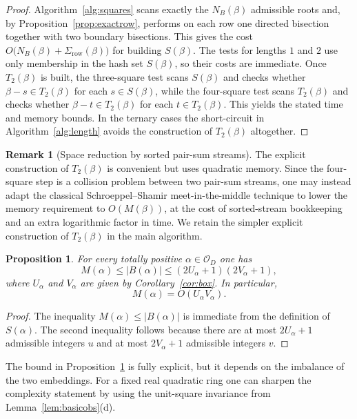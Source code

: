 \documentclass[manuscript,screen]{acmart}
\renewcommand{\le}{\leqslant}
\theoremstyle{plain}
\newtheorem{proposition}[theorem]{Proposition}
\theoremstyle{definition}
\theoremstyle{nonitalicremark}
\newtheorem{remark}[theorem]{Remark}
\newcommand{\OD}{\mathcal{O}_D}
\begin{document}
\begin{proof}
Algorithm~\ref{alg:squares} scans exactly the $N_B(\beta)$ admissible roots and, by
Proposition~\ref{prop:exactrow}, performs on each row one directed bisection together with two
boundary bisections. This gives the cost
$O\!\bigl(N_B(\beta)+\Sigma_{\mathrm{row}}(\beta)\bigr)$ for building $S(\beta)$.
The tests for lengths $1$ and $2$ use only membership in the hash set $S(\beta)$, so their
costs are immediate. Once $T_2(\beta)$ is built, the three-square test scans $S(\beta)$ and
checks whether $\beta-s\in T_2(\beta)$ for each $s\in S(\beta)$, while the four-square test
scans $T_2(\beta)$ and checks whether $\beta-t\in T_2(\beta)$ for each $t\in T_2(\beta)$.
This yields the stated time and memory bounds. In the ternary cases the short-circuit in
Algorithm~\ref{alg:length} avoids the construction of $T_2(\beta)$ altogether.
\end{proof}

\begin{remark}[Space reduction by sorted pair-sum streams]\label{rem:ss}
The explicit construction of $T_2(\beta)$ is convenient but uses quadratic memory.
Since the four-square step is a collision problem between two pair-sum streams, one may instead
adapt the classical Schroeppel--Shamir meet-in-the-middle technique \cite{SS} to lower the memory
requirement to $O(M(\beta))$, at the cost of sorted-stream bookkeeping and an extra logarithmic
factor in time. We retain the simpler explicit construction of $T_2(\beta)$ in the main
algorithm.
\end{remark}

\begin{proposition}\label{prop:boxsize}
For every totally positive $\alpha \in \OD$ one has
\[
M(\alpha) \le |B(\alpha)| \le (2U_\alpha+1)(2V_\alpha+1),
\]
where $U_\alpha$ and $V_\alpha$ are given by Corollary~\ref{cor:box}.
In particular,
\[
M(\alpha)=O(U_\alpha V_\alpha).
\]
\end{proposition}

\begin{proof}
The inequality $M(\alpha)\le |B(\alpha)|$ is immediate from the definition of $S(\alpha)$.
The second inequality follows because there are at most $2U_\alpha+1$ admissible integers $u$
and at most $2V_\alpha+1$ admissible integers $v$.
\end{proof}

The bound in Proposition~\ref{prop:boxsize} is fully explicit, but it depends on the imbalance of
the two embeddings. For a fixed real quadratic ring one can sharpen the complexity statement by
using the unit-square invariance from Lemma~\ref{lem:basicobs}(d).
\end{document}
